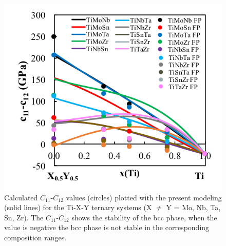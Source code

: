 \pagebreak
\begin{figure}[H]
	\centering
	\includegraphics[width=\textwidth]{Chapter-6/Figures/tixyc11-c12.png}
	\caption{Calculated $\overline{C}_{11}$-$\overline{C}_{12}$ values (circles) plotted with the present modeling (solid lines) for the Ti-X-Y ternary systems (X $\neq$ Y = Mo, Nb, Ta, Sn, Zr). The $\overline{C}_{11}$-$\overline{C}_{12}$ shows the stability of the bcc phase, when the value is negative the bcc phase is not stable in the corresponding composition ranges.}
	\label{Ch6-figure:tixyc11-c12}
\end{figure}

